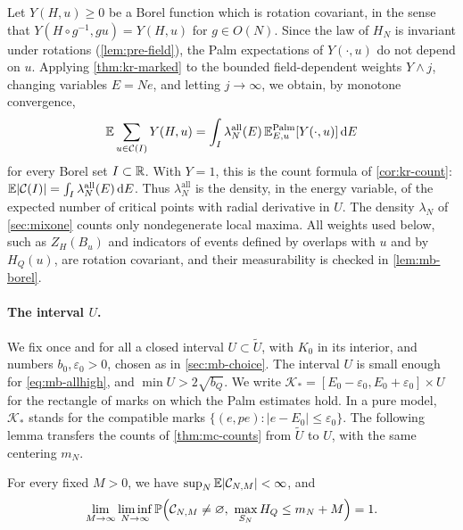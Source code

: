 Let $Y(H,u)\ge0$ be a Borel function which is rotation covariant, in the sense that $Y(H\circ g^{-1},gu)=Y(H,u)$ for $g\in O(N)$. Since the law of $H_N$ is invariant under rotations (\cref{lem:pre-field}), the Palm expectations of $Y(\cdot,u)$ do not depend on $u$. Applying \cref{thm:kr-marked} to the bounded field-dependent weights $Y\wedge j$, changing variables $E=Ne$, and letting $j\to\infty$, we obtain, by monotone convergence,
\begin{equation}\label{eq:mb-kr}
\mathbb E\sum_{u\in\mathcal C(I)}Y(H,u)=\int_I\lambda^{\mathrm{all}}_N(E)\,\mathbb E^{\mathrm{Palm}}_{E,u}[Y(\cdot,u)]\,\mathrm d E
\end{equation}
for every Borel set $I\subset\mathbb R$. With $Y=1$, this is the count formula of \cref{cor:kr-count}: $\mathbb E|\mathcal C(I)|=\int_I\lambda^{\mathrm{all}}_N(E)\,\mathrm d E$. Thus $\lambda^{\mathrm{all}}_N$ is the density, in the energy variable, of the expected number of critical points with radial derivative in $U$. The density $\lambda_N$ of \cref{sec:mixone} counts only nondegenerate local maxima. All weights used below, such as $Z_H(B_u)$ and indicators of events defined by overlaps with $u$ and by $H_Q(u)$, are rotation covariant, and their measurability is checked in \cref{lem:mb-borel}.

\paragraph{The interval $U$.}
We fix once and for all a closed interval $U\subset \widetilde U$, with $K_0$ in its interior, and numbers $b_0,\varepsilon_0>0$, chosen as in \cref{sec:mb-choice}. The interval $U$ is small enough for \eqref{eq:mb-allhigh}, and $\min U>2\sqrt{b_Q}$. We write $\mathcal K_*=[E_0-\varepsilon_0,E_0+\varepsilon_0]\times U$ for the rectangle of marks on which the Palm estimates hold. In a pure model, $\mathcal K_*$ stands for the compatible marks $\{(e,pe):|e-E_0|\le\varepsilon_0\}$. The following lemma transfers the counts of \cref{thm:mc-counts} from $\widetilde U$ to $U$, with the same centering $m_N$.

\begin{lemma}\label{lem:mb-counts}
For every fixed $M>0$, we have $\sup_N\mathbb E|\mathcal C_{N,M}|<\infty$, and
\begin{equation}\label{eq:mb-existence}
\lim_{M\to\infty}\liminf_{N\to\infty}\Pp\Bigl(\cC_{N,M}\neq\varnothing,\ \max_{S_N}H_Q\le m_N+M\Bigr)=1.
\end{equation}
\end{lemma}

